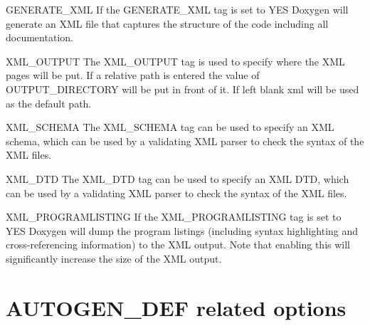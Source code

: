 \begin{DoxyDescription}
\item[{\ttfamily GENERATE\_\-XML} ] If the {\ttfamily GENERATE\_\-XML} tag is set to {\ttfamily YES} Doxygen will generate an XML file that captures the structure of the code including all documentation.

\label{config_cfg_xml_output}
\hypertarget{config_cfg_xml_output}{}
 
\item[{\ttfamily XML\_\-OUTPUT} ] The {\ttfamily XML\_\-OUTPUT} tag is used to specify where the XML pages will be put. If a relative path is entered the value of {\ttfamily OUTPUT\_\-DIRECTORY} will be put in front of it. If left blank {\ttfamily xml} will be used as the default path.

\label{config_cfg_xml_schema}
\hypertarget{config_cfg_xml_schema}{}
 
\item[{\ttfamily XML\_\-SCHEMA} ] The {\ttfamily XML\_\-SCHEMA} tag can be used to specify an XML schema, which can be used by a validating XML parser to check the syntax of the XML files.

\label{config_cfg_xml_dtd}
\hypertarget{config_cfg_xml_dtd}{}
 
\item[{\ttfamily XML\_\-DTD} ] The {\ttfamily XML\_\-DTD} tag can be used to specify an XML DTD, which can be used by a validating XML parser to check the syntax of the XML files.

\label{config_cfg_xml_programlisting}
\hypertarget{config_cfg_xml_programlisting}{}
 
\item[{\ttfamily XML\_\-PROGRAMLISTING} ] If the {\ttfamily XML\_\-PROGRAMLISTING} tag is set to {\ttfamily YES} Doxygen will dump the program listings (including syntax highlighting and cross-\/referencing information) to the XML output. Note that enabling this will significantly increase the size of the XML output.


\end{DoxyDescription}\hypertarget{config_autogen_output}{}\section{AUTOGEN\_\-DEF related options}\label{config_autogen_output}
\label{config_cfg_generate_autogen_def}
\hypertarget{config_cfg_generate_autogen_def}{}
 
